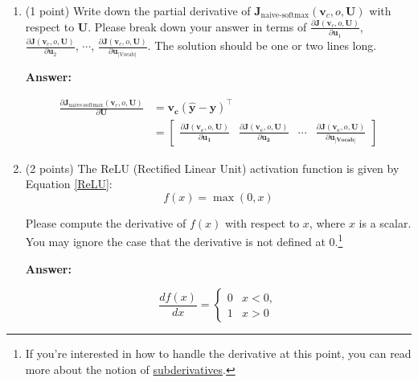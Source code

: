 \documentclass{article}
\newenvironment{answer}{
        {\bf Answer:} \sf \begingroup\color{red}
    }{\endgroup}%
\begin{document}
\begin{enumerate}
        \item (1 point) Write down the partial derivative of $\bm J_{\text{naive-softmax}}(\bm v_c, o, \bm U)$ with respect to $\bm U$. Please break down your answer in terms of $\frac{\partial \bm J(\bm v_c, o, \bm U)}{\partial \bm u_1}$, $\frac{\partial \bm J(\bm v_c, o, \bm U)}{\partial \bm u_2}$, $\cdots$, $\frac{\partial \bm J(\bm v_c, o, \bm U)}{\partial \bm u_{|\text{Vocab}|}}$. The solution should be one or two lines long.

        \begin{shaded}
            \begin{answer}
                \[
                    \begin{aligned}
                        \frac{\partial \bm J_{\text{naive-softmax}}(\bm v_c, o, \bm U)}{\partial \bm{U}}
                        &= \bm{v_c} (\bm{\hat{y}}-\bm{y})^{\top} \\
                        &= \begin{bmatrix}
                               \frac{\partial \bm{J}(\bm{v_c},o,\bm{U})}{\partial \bm{u_1}} & \frac{\partial \bm{J}(\bm{v_c},o,\bm{U})}{\partial \bm{u_2}} & \cdots & \frac{\partial \bm{J}(\bm{v_c},o,\bm{U})}{\partial \bm{u_{|\text{Vocab}|}}}
                        \end{bmatrix}
                    \end{aligned}
                \]
            \end{answer}
        \end{shaded}

        \item (2 points) The ReLU (Rectified Linear Unit) activation function is given by Equation \ref{ReLU}:
        \begin{equation}
            \label{ReLU}
            f(x) = \max(0, x)
        \end{equation}

        Please compute the derivative of $f(x)$ with respect to $x$, where $x$ is a scalar. You may ignore the case that the derivative is not defined at 0.\footnote{If you're interested in how to handle the derivative at this point, you can read more about the notion of \hyperref[https://en.wikipedia.org/wiki/Subderivative]{subderivatives}.}

        \begin{shaded}
            \begin{answer}
                \begin{equation}
                    \frac{df(x)}{dx}
                    =
                    \begin{cases}
                        0 & x < 0, \\
                        1 & x > 0
                    \end{cases}\label{eq:equation}
                \end{equation}
            \end{answer}
        \end{shaded}


\end{enumerate}
\end{document}
